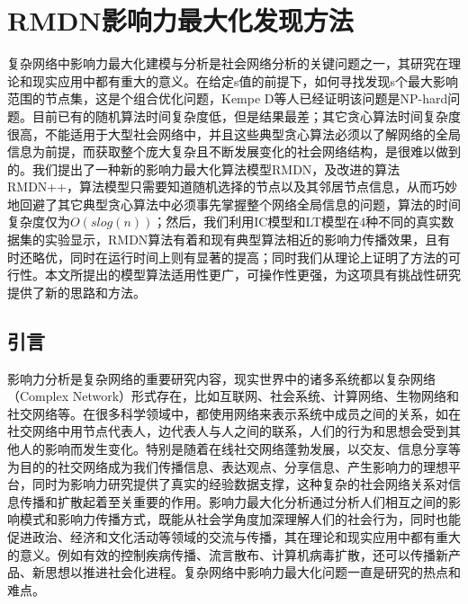 

\chapter{RMDN影响力最大化发现方法}
\label{cha:4thChap04}
复杂网络中影响力最大化建模与分析是社会网络分析的关键问题之一，其研究在理论和现实应用中都有重大的意义。在给定s值的前提下，如何寻找发现s个最大影响范围的节点集，这是个组合优化问题，Kempe D等人已经证明该问题是NP-hard问题。目前已有的随机算法时间复杂度低，但是结果最差；其它贪心算法时间复杂度很高，不能适用于大型社会网络中，并且这些典型贪心算法必须以了解网络的全局信息为前提，而获取整个庞大复杂且不断发展变化的社会网络结构，是很难以做到的。我们提出了一种新的影响力最大化算法模型RMDN，及改进的算法RMDN++，算法模型只需要知道随机选择的节点以及其邻居节点信息，从而巧妙地回避了其它典型贪心算法中必须事先掌握整个网络全局信息的问题，算法的时间复杂度仅为$O(slog(n))$；然后，我们利用IC模型和LT模型在4种不同的真实数据集的实验显示，RMDN算法有着和现有典型算法相近的影响力传播效果，且有时还略优，同时在运行时间上则有显著的提高；同时我们从理论上证明了方法的可行性。本文所提出的模型算法适用性更广，可操作性更强，为这项具有挑战性研究提供了新的思路和方法。
\section{引言}
影响力分析是复杂网络的重要研究内容，现实世界中的诸多系统都以复杂网络（Complex Network）形式存在，比如互联网、社会系统、计算网络、生物网络和社交网络等。在很多科学领域中，都使用网络来表示系统中成员之间的关系，如在社交网络中用节点代表人，边代表人与人之间的联系，人们的行为和思想会受到其他人的影响而发生变化。特别是随着在线社交网络蓬勃发展，以交友、信息分享等为目的的社交网络成为我们传播信息、表达观点、分享信息、产生影响力的理想平台，同时为影响力研究提供了真实的经验数据支撑，这种复杂的社会网络关系对信息传播和扩散起着至关重要的作用。影响力最大化分析通过分析人们相互之间的影响模式和影响力传播方式，既能从社会学角度加深理解人们的社会行为，同时也能促进政治、经济和文化活动等领域的交流与传播，其在理论和现实应用中都有重大的意义。例如有效的控制疾病传播、流言散布、计算机病毒扩散，还可以传播新产品、新思想以推进社会化进程。复杂网络中影响力最大化问题一直是研究的热点和难点。


